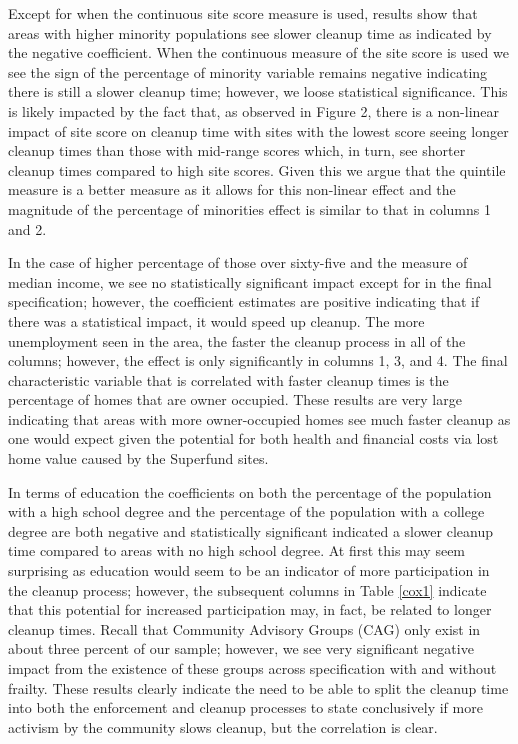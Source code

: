 \documentclass[12pt]{article}
\begin{document}
{Except for when the continuous site score measure is used, results show that areas with higher minority populations see slower cleanup time as indicated by the negative coefficient. When the continuous measure of the site score is used we see the sign of the percentage of minority variable remains negative indicating there is still a slower cleanup time; however, we loose statistical significance. This is likely impacted by the fact that, as observed in Figure 2, there is a non-linear impact of site score on cleanup time with sites with the lowest score seeing longer cleanup times than those with mid-range scores which, in turn, see shorter cleanup times compared to high site scores. Given this we argue that the quintile measure is a better measure as it allows for this non-linear effect and the magnitude of the percentage of minorities effect is similar to that in columns 1 and 2.

In the case of higher percentage of those over sixty-five and the measure of median income, we see no statistically significant impact except for in the final specification; however, the coefficient estimates are positive indicating that if there was a statistical impact, it would speed up cleanup. The more unemployment seen in the area, the faster the cleanup process in all of the columns; however, the effect is only significantly in columns 1, 3, and 4. The final characteristic variable that is correlated with faster cleanup times is the percentage of homes that are owner occupied. These results are very large indicating that areas with more owner-occupied homes see much faster cleanup as one would expect given the potential for both health and financial costs via lost home value caused by the Superfund sites. 

In terms of education the coefficients on both the percentage of the population with a high school degree and the percentage of the population with a college degree are both negative and statistically significant indicated a slower cleanup time compared to areas with no high school degree. At first this may seem surprising as education would seem to be an indicator of more participation in the cleanup process; however, the subsequent columns in Table \ref{cox1} indicate that this potential for increased participation may, in fact, be related to longer cleanup times. Recall that Community Advisory Groups (CAG) only exist in about three percent of our sample; however, we see very significant negative impact from the existence of these groups across specification with and without frailty. These results clearly indicate the need to be able to split the cleanup time into both the enforcement and cleanup processes to state conclusively if more activism by the community slows cleanup, but the correlation is clear. 

}
\end{document}
